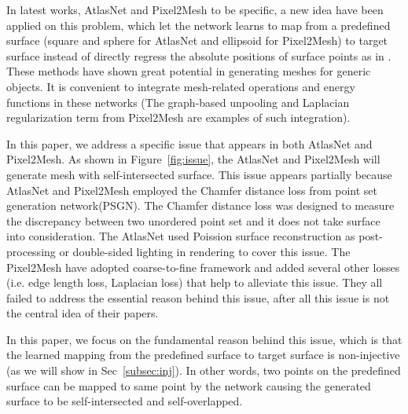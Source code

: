 In latest works, AtlasNet\cite{atlasnet} and Pixel2Mesh\cite{pixel2mesh} to be specific, a new idea have been applied on this problem, which let the network learns to map from a predefined surface (square and sphere for AtlasNet and ellipsoid for Pixel2Mesh) to target surface instead of directly regress the absolute positions of surface points as in \cite{PSGN}. These methods have shown great potential in generating meshes for generic objects. It is convenient to integrate mesh-related operations and energy functions in these networks (The graph-based unpooling and Laplacian regularization term from Pixel2Mesh are examples of such integration).

In this paper, we address a specific issue that appears in both AtlasNet\cite{atlasnet} and Pixel2Mesh\cite{pixel2mesh}. As shown in Figure~\ref{fig:issue}, the AtlasNet and Pixel2Mesh will generate mesh with self-intersected surface. This issue appears partially because AtlasNet and Pixel2Mesh employed the Chamfer distance loss from point set generation network(PSGN)\cite{PSGN}. The Chamfer distance loss was designed to measure the discrepancy between two unordered point set and it does not take surface into consideration. The AtlasNet used Poission surface reconstruction as post-processing or double-sided lighting in rendering to cover this issue. The Pixel2Mesh have adopted coarse-to-fine framework and added several other losses (i.e. edge length loss, Laplacian loss) that help to alleviate this issue. They all failed to address the essential reason behind this issue, after all this issue is not the central idea of their papers.

In this paper, we focus on the fundamental reason behind this issue, which is that the learned mapping from the predefined surface to target surface is non-injective (as we will show in Sec~\ref{subsec:inj}). In other words, two points on the predefined surface can be mapped to same point by the network causing the generated surface to be self-intersected and self-overlapped. 

